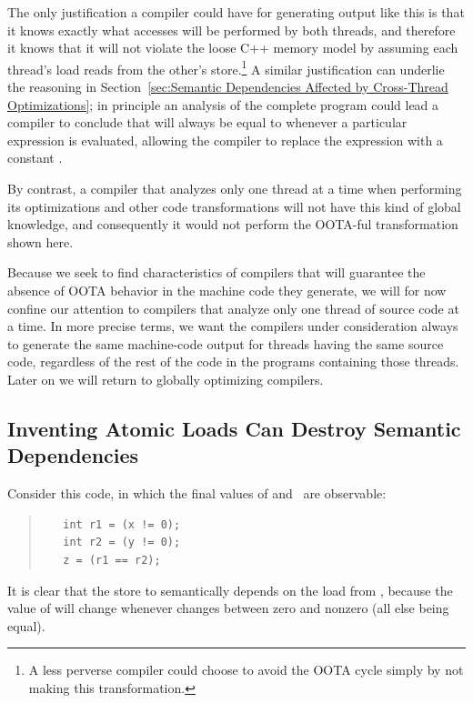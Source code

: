 \documentclass[10]{article}
\begin{document}
The only justification a compiler could have for generating output like
this is that it knows exactly what accesses will be performed by both
threads, and therefore it knows that it will not violate the loose C++
memory model by assuming each thread's load reads from the other's
store.\footnote{
	A less perverse compiler could choose to avoid the
	OOTA cycle simply by not making this transformation.}
A similar justification can underlie the reasoning in
Section~\ref{sec:Semantic Dependencies Affected by Cross-Thread Optimizations};
in principle an analysis of the complete program could lead a compiler
to conclude that  will always be equal to  whenever a
particular  expression is evaluated, allowing the compiler
to replace the expression with a constant .

By contrast, a compiler that analyzes only one thread at a time when
performing its optimizations and other code transformations will not
have this kind of global knowledge, and consequently it would not
perform the OOTA-ful transformation shown here.

Because we seek to find characteristics of compilers that will
guarantee the absence of OOTA behavior in the machine code they generate,
we will for now confine our attention to compilers that analyze only
one thread of source code at a time.
In more precise terms, we want the compilers under consideration
always to generate the same machine-code output for threads having
the same source code, regardless of the rest of the code in the programs
containing those threads.
Later on we will return to globally optimizing compilers.

\subsection{Inventing Atomic Loads Can Destroy Semantic Dependencies}
\label{sec:Inventing Atomic Loads Can Destroy Semantic Dependencies}

Consider this code, in which the final values of  and~
are observable:
\begin{quote}
\begin{verbatim}
   int r1 = (x != 0);
   int r2 = (y != 0);
   z = (r1 == r2);
\end{verbatim}
\end{quote}
It is clear that the store to  semantically depends on the load
from , because the value of  will change whenever 
changes between zero and nonzero (all else being equal).
\end{document}
